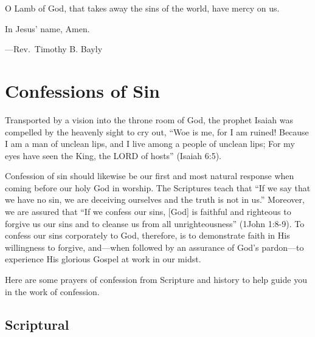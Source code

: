 \documentclass[]{book}
\begin{document}
O Lamb of God, that takes away the sins of the world, have mercy on us.

In Jesus' name, Amen.

---Rev.~Timothy B. Bayly

\hypertarget{confessions-of-sin}{%
\chapter{Confessions of Sin}\label{confessions-of-sin}}

Transported by a vision into the throne room of God, the prophet Isaiah was compelled by the heavenly sight to cry out, ``Woe is me, for I am ruined! Because I am a man of unclean lips, and I live among a people of unclean lips; For my eyes have seen the King, the LORD of hosts'' (Isaiah 6:5).

Confession of sin should likewise be our first and most natural response when coming before our holy God in worship. The Scriptures teach that ``If we say that we have no sin, we are deceiving ourselves and the truth is not in us.'' Moreover, we are assured that ``If we confess our sins, {[}God{]} is faithful and righteous to forgive us our sins and to cleanse us from all unrighteousness'' (1John 1:8-9). To confess our sins corporately to God, therefore, is to demonstrate faith in His willingness to forgive, and---when followed by an assurance of God's pardon---to experience His glorious Gospel at work in our midst.

Here are some prayers of confession from Scripture and history to help guide you in the work of confession.

\hypertarget{scriptural}{%
\section{Scriptural}\label{scriptural}}
\end{document}
